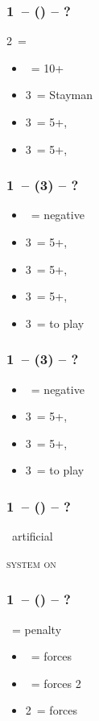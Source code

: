 \documentclass[12pt, a4paper]{article}
\begin{document}
\subsubsection*{1\ntx\ -- (\alrts{2\nt}) -- ?}
2\nt\ = \minor
\begin{itemize}
    \item \dbl\ = 10+
    \item 3\clubs\ = Stayman
    \item 3\diams\ = 5+\hearts, \invp
    \item 3\hearts\ = 5+\spades, \invp
\end{itemize}

\subsubsection*{1\ntx\ -- (3\clubs) -- ?}
\begin{itemize}
    \item \dbl\ = negative
    \item 3\diams\ = 5+\hearts, \invp
    \item 3\hearts\ = 5+\spades, \invp
    \item 3\spades\ = 5+\diams, \invp
    \item 3\nt\ = to play
\end{itemize}

\subsubsection*{1\ntx\ -- (3\diams) -- ?}
\begin{itemize}
    \item \dbl\ = negative
    \item 3\hearts\ = 5+\spades, \invp
    \item 3\spades\ = 5+\hearts, \gf
    \item 3\nt\ = to play
\end{itemize}

\subsubsection*{1\ntx\ -- (\alrts{\dbl}) -- ?}
\dbl\ artificial

\textsc{system on}

\subsubsection*{1\ntx\ -- (\dbl) -- ?}
\dbl\ = penalty
\begin{itemize}
    \item \pass\ = forces \rdbl
    \item \rdbl\ = forces 2\clubs
    \item 2\ = forces 
\end{itemize}
\end{document}
